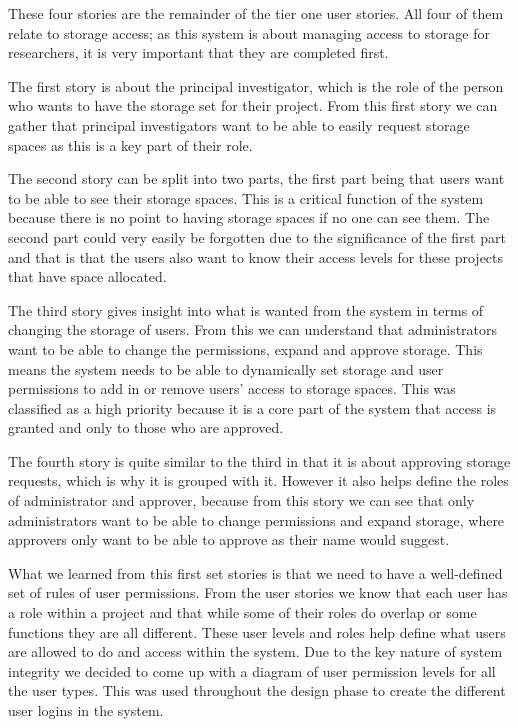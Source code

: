 \documentclass[a4paper,titlepage,12pt]{article}
\begin{document}
These four stories are the remainder of the tier one user stories. All four of
them relate to storage access; as this system is about managing access to
storage for researchers, it is very important that they are completed first.

The first story is about the principal investigator, which is the role of the
person who wants to have the storage set for their project. From this first
story we can gather that principal investigators want to be able to easily
request storage spaces as this is a key part of their role.

The second story can be split into two parts, the first part being that users
want to be able to see their storage spaces. This is a critical function of the
system because there is no point to having storage spaces if no one can see
them. The second part could very easily be forgotten due to the significance of
the first part and that is that the users also want to know their access levels
for these projects that have space allocated.

The third story gives insight into what is wanted from the system in terms of
changing the storage of users. From this we can understand that administrators
want to be able to change the permissions, expand and approve storage. This
means the system needs to be able to dynamically set storage and user
permissions to add in or remove users' access to storage spaces. This was
classified as a high priority because it is a core part of the system that
access is granted and only to those who are approved.

The fourth story is quite similar to the third in that it is about approving
storage requests, which is why it is grouped with it. However it also helps
define the roles of administrator and approver, because from this story we can
see that only administrators want to be able to change permissions and expand
storage, where approvers only want to be able to approve as their name would
suggest.

What we learned from this first set stories is that we need to have a
well-defined set of rules of user permissions. From the user stories we know
that each user has a role within a project and that while some of their roles
do overlap or some functions they are all different. These user levels and
roles help define what users are allowed to do and access within the system.
Due to the key nature of system integrity we decided to come up with a diagram
of user permission levels for all the user types. This was used throughout the
design phase to create the different user logins in the system.
\end{document}
